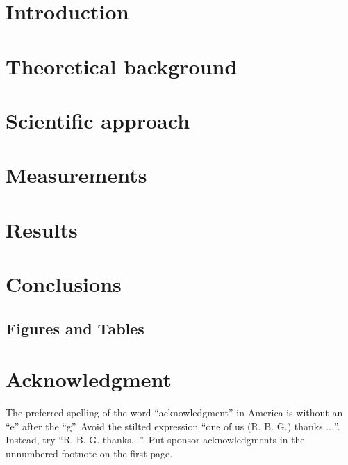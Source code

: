 \documentclass[conference]{IEEEtran}
\begin{document}
\section{Introduction}



\section{Theoretical background}







\section{Scientific approach}



\section{Measurements}









\section{Results} \label{sec_results}

\section{Conclusions}

\subsection{Figures and Tables}

\section*{Acknowledgment}

The preferred spelling of the word ``acknowledgment'' in America is without 
an ``e'' after the ``g''. Avoid the stilted expression ``one of us (R. B. 
G.) thanks $\ldots$''. Instead, try ``R. B. G. thanks$\ldots$''. Put sponsor 
acknowledgments in the unnumbered footnote on the first page.


\printbibliography
\end{document}
